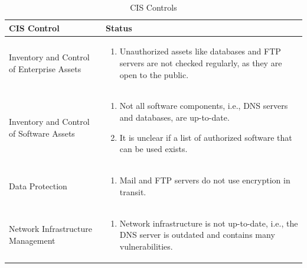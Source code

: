 \newpage
\begingroup
\centering
\setlength{\tabcolsep}{6.5pt} %
\renewcommand{\arraystretch}{1.8} %
\begin{longtable}{ |p{7cm}| p{8cm} |}
\caption{CIS Controls}
    \label{table:cis}
\hline
\rowcolor{grey!15}
\textbf{CIS Control}  & \textbf{Status}\\
\hline
Inventory and Control of Enterprise Assets  &  
\vspace{-\baselineskip}
\begin{enumerate} 
    \item Unauthorized assets like databases and FTP servers are not checked regularly, as they are open to the public.
\end{enumerate}\\
\hline
Inventory and Control of Software Assets  &  
\vspace{-\baselineskip}
\begin{enumerate}
    \item Not all software components, i.e., DNS servers and databases, are up-to-date.
    \item It is unclear if a list of authorized software that can be used exists.
\end{enumerate}\\
\hline
Data Protection  &  
\vspace{-\baselineskip}
\begin{enumerate}
    \item Mail and FTP servers do not use encryption in transit.
\end{enumerate}\\
\hline
Network Infrastructure Management  &  
    \vspace{-\baselineskip}
    \begin{enumerate}
        \item Network infrastructure is not up-to-date, i.e., the DNS server is outdated and contains many vulnerabilities.
    \end{enumerate}\\
\hline
\end{longtable}
\endgroup

